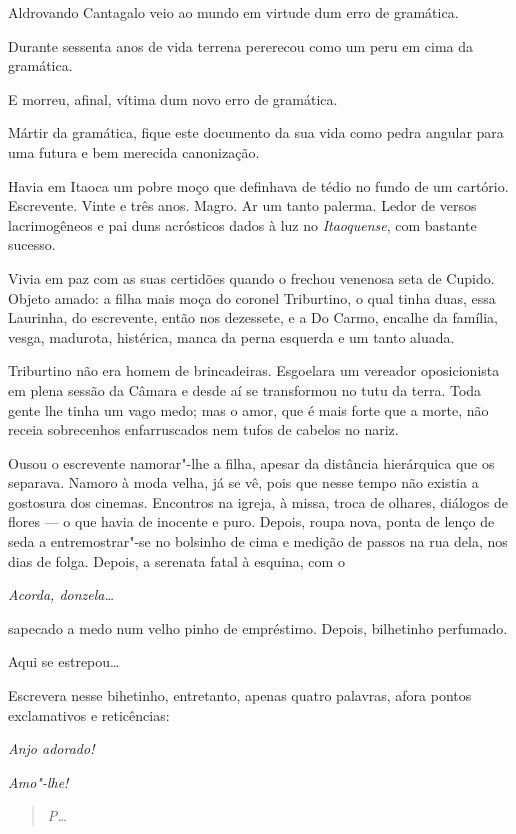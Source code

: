 Aldrovando Cantagalo veio ao mundo em virtude dum erro de gramática.

Durante sessenta anos de vida terrena pererecou como um peru em cima da
gramática.

E morreu, afinal, vítima dum novo erro de gramática.

Mártir da gramática, fique este documento da sua vida como pedra angular
para uma futura e bem merecida canonização.

Havia em Itaoca um pobre moço que definhava de tédio no fundo de um
cartório. Escrevente. Vinte e três anos. Magro. Ar um tanto palerma.
Ledor de versos lacrimogêneos e pai duns acrósticos dados à luz no
\emph{Itaoquense}, com bastante sucesso.

Vivia em paz com as suas certidões quando o frechou venenosa seta de
Cupido. Objeto amado: a filha mais moça do coronel Triburtino, o qual
tinha duas, essa Laurinha, do escrevente, então nos dezessete, e a Do
Carmo, encalhe da família, vesga, madurota, histérica, manca da perna
esquerda e um tanto aluada.

Triburtino não era homem de brincadeiras. Esgoelara um vereador
oposicionista em plena sessão da Câmara e desde aí se transformou no
tutu da terra. Toda gente lhe tinha um vago medo; mas o amor, que é mais
forte que a morte, não receia sobrecenhos enfarruscados nem tufos de
cabelos no nariz.

Ousou o escrevente namorar"-lhe a filha, apesar da distância hierárquica
que os separava. Namoro à moda velha, já se vê, pois que nesse tempo não
existia a gostosura dos cinemas. Encontros na igreja, à missa, troca de
olhares, diálogos de flores --- o que havia de inocente e puro. Depois,
roupa nova, ponta de lenço de seda a entremostrar"-se no bolsinho de cima
e medição de passos na rua dela, nos dias de folga. Depois, a serenata
fatal à esquina, com o

\emph{Acorda, donzela\ldots{} }

sapecado a medo num velho pinho de empréstimo. Depois, bilhetinho
perfumado.

Aqui se estrepou\ldots{}

Escrevera nesse bihetinho, entretanto, apenas quatro palavras, afora
pontos exclamativos e reticências:

\emph{Anjo adorado!}

\emph{Amo"-lhe!}

\begin{quote}
\emph{P\ldots{}}
\end{quote}


